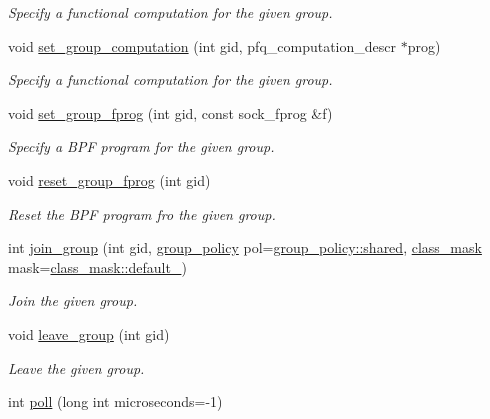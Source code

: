 \begin{DoxyCompactItemize}
\begin{DoxyCompactList}\small\item\em Specify a functional computation for the given group. \end{DoxyCompactList}\item 
void \hyperlink{classnet_1_1pfq_a50af39653699ccbf9c0b2412a17e01a6}{set\+\_\+group\+\_\+computation} (int gid, pfq\+\_\+computation\+\_\+descr $\ast$prog)
\begin{DoxyCompactList}\small\item\em Specify a functional computation for the given group. \end{DoxyCompactList}\item 
void \hyperlink{classnet_1_1pfq_a5290b64ce270cfc46a9fbecc21802cc3}{set\+\_\+group\+\_\+fprog} (int gid, const sock\+\_\+fprog \&f)
\begin{DoxyCompactList}\small\item\em Specify a B\+P\+F program for the given group. \end{DoxyCompactList}\item 
void \hyperlink{classnet_1_1pfq_a4d6b1fb7c2b3538bf7b66fb0a92bf87b}{reset\+\_\+group\+\_\+fprog} (int gid)
\begin{DoxyCompactList}\small\item\em Reset the B\+P\+F program fro the given group. \end{DoxyCompactList}\item 
int \hyperlink{classnet_1_1pfq_ad7e62e04d59c1f2214ff5314bb6b3825}{join\+\_\+group} (int gid, \hyperlink{namespacenet_aedc1a0dde937ddbd0800af02920b1067}{group\+\_\+policy} pol=\hyperlink{namespacenet_aedc1a0dde937ddbd0800af02920b1067a9e81e7b963c71363e2fb3eefcfecfc0e}{group\+\_\+policy\+::shared}, \hyperlink{namespacenet_a1dbd93552dc6ef6fbb0bb79d43ca22fd}{class\+\_\+mask} mask=\hyperlink{namespacenet_a1dbd93552dc6ef6fbb0bb79d43ca22fda172b03053216c6158fe380805998ad6c}{class\+\_\+mask\+::default\+\_\+})
\begin{DoxyCompactList}\small\item\em Join the given group. \end{DoxyCompactList}\item 
void \hyperlink{classnet_1_1pfq_af90932832d9695326df7af8b2d629660}{leave\+\_\+group} (int gid)
\begin{DoxyCompactList}\small\item\em Leave the given group. \end{DoxyCompactList}\item 
int \hyperlink{classnet_1_1pfq_ae082956072242f6a05a9ba3ab076b59e}{poll} (long int microseconds=-\/1)

\end{DoxyCompactItemize}
